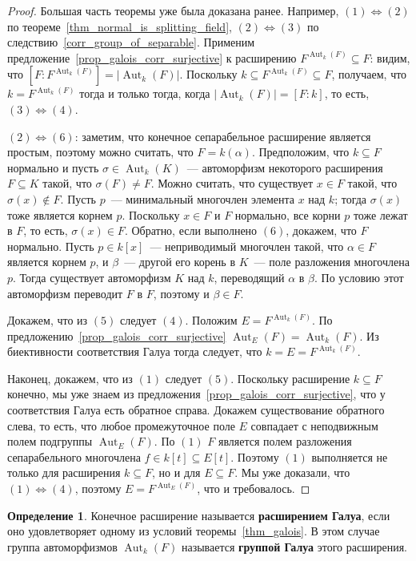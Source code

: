 \documentclass[a4paper,11pt]{scrartcl}
\theoremstyle{plain}
\theoremstyle{definition}
\newtheorem{definition}[theorem]{Определение}
\newcommand\dfn[1]{\textbf{#1}}
\newcommand\sseq{\subseteq}
\newcommand\Aut{\operatorname{Aut}}
\newcommand\Equiv{\Leftrightarrow}
\begin{document}
\begin{proof}
Большая часть теоремы уже была доказана ранее. Например, $(1)\Equiv
(2)$ по теореме~\ref{thm_normal_is_splitting_field}, $(2)\Equiv (3)$
по следствию~\ref{corr_group_of_separable}.
Применим предложение~\ref{prop_galois_corr_surjective} к расширению
$F^{\Aut_k(F)}\sseq F$: видим, что
$[F:F^{\Aut_k(F)}]=|\Aut_k(F)|$. Поскольку $k\sseq F^{\Aut_k(F)}\sseq
F$, получаем, что $k=F^{\Aut_k(F)}$ тогда и только тогда, когда
$|\Aut_k(F)|=[F:k]$, то есть, $(3)\Equiv (4)$.

$(2)\Equiv (6)$: заметим, что конечное сепарабельное расширение
является простым, поэтому можно считать, что $F=k(\alpha)$.
Предположим,
что $k\sseq F$ нормально и пусть $\sigma\in\Aut_k(K)$~--- автоморфизм
некоторого расширения $F\sseq K$ такой, что $\sigma(F)\neq F$. Можно
считать, что существует $x\in F$ такой, что $\sigma(x)\notin
F$. Пусть $p$~--- минимальный многочлен элемента $x$ над $k$; тогда
$\sigma(x)$ тоже является корнем $p$. Поскольку $x\in F$ и $F$
нормально, все корни $p$ тоже лежат в $F$, то есть, $\sigma(x)\in
F$. Обратно, если выполнено $(6)$, докажем, что $F$ нормально. Пусть
$p\in k[x]$~--- неприводимый многочлен такой, что $\alpha\in F$
является корнем $p$, и
$\beta$~--- другой его корень в $K$~--- поле разложения многочлена
$p$.
Тогда существует автоморфизм $K$ над $k$, переводящий $\alpha$ в
$\beta$.
По условию этот автоморфизм переводит $F$ в $F$, поэтому и
$\beta\in F$.

Докажем, что из $(5)$ следует $(4)$. Положим $E=F^{\Aut_k(F)}$. По
предложению~\ref{prop_galois_corr_surjective}
$\Aut_E(F)=\Aut_k(F)$. Из биективности соответствия Галуа тогда
следует, что $k=E=F^{\Aut_k(F)}$.

Наконец, докажем, что из $(1)$ следует $(5)$. Поскольку расширение
$k\sseq F$ конечно, мы уже знаем из
предложения~\ref{prop_galois_corr_surjective}, что у соответствия
Галуа есть обратное справа. Докажем существование обратного слева, то
есть, что любое промежуточное поле $E$ совпадает с неподвижным полем
подгруппы $\Aut_E(F)$. По $(1)$ $F$ является полем разложения
сепарабельного многочлена $f\in k[t]\sseq E[t]$. Поэтому $(1)$
выполняется не только для расширения $k\sseq F$, но и для $E\sseq
F$. Мы уже доказали, что $(1)\Equiv (4)$, поэтому $E=F^{\Aut_E(F)}$,
что и требовалось.
\end{proof}

\begin{definition}
Конечное расширение называется \dfn{расширением Галуа}, если оно
удовлетворяет одному из условий теоремы~\ref{thm_galois}. В этом
случае группа автоморфизмов $\Aut_k(F)$ называется \dfn{группой Галуа}
этого расширения.
\end{definition}
\end{document}
